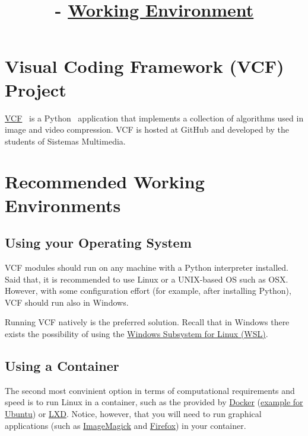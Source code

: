 

\title{\SM{} - \href{https://github.com/Sistemas-Multimedia/Sistemas-Multimedia.github.io/tree/master/contents/working_environment}{Working Environment}}

\maketitle

\tableofcontents

\section{Visual Coding Framework (VCF) Project}
\href{https://github.com/Sistemas-Multimedia/VCF}{VCF}~\cite{vruiz__VCF}
is a Python~\cite{python} application that implements a collection of
algorithms used in image and video compression. VCF is hosted at
GitHub and developed by the students of Sistemas Multimedia.

\section{Recommended Working Environments}

\subsection{Using your Operating System}
VCF modules should run on any machine with a Python interpreter
installed. Said that, it is recommended to use Linux or a
UNIX-based OS such as OSX. However, with some configuration effort
(for example, after installing Python), VCF should run also in
Windows.

Running VCF natively is the preferred solution. Recall that in Windows
there exists the possibility of using the
\href{https://learn.microsoft.com/en-us/windows/wsl/install}{Windows
  Subsystem for Linux (WSL)}.

\subsection{Using a Container}
The second most convinient option in terms of computational
requirements and speed is to run Linux in a container, such
as the provided by \href{https://hub.docker.com/}{Docker}
(\href{https://hub.docker.com/_/ubuntu}{example for Ubuntu})
or \href{https://linuxcontainers.org/}{LXD}. Notice, however, that you
will need to run graphical applications (such
as \href{https://linuxcontainers.org/}{ImageMagick}
and \href{https://www.mozilla.org/firefox}{Firefox}) in your
container.

